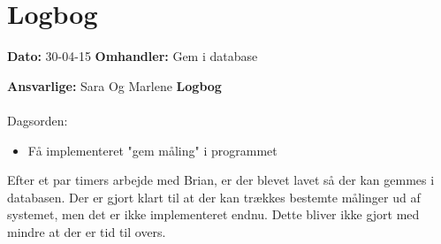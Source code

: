 \chapter{Logbog}

\textbf{Dato:} 30-04-15
\textbf{Omhandler:} Gem i database

\textbf{Ansvarlige:} Sara Og Marlene
\textbf{Logbog}
\\
\\
Dagsorden:
\begin{itemize}
	\item Få implementeret "gem måling" i programmet
\end{itemize}

Efter et par timers arbejde med Brian, er der blevet lavet så der kan gemmes i databasen. Der er gjort klart til at der kan trækkes bestemte målinger ud af systemet, men det er ikke implementeret endnu. Dette bliver ikke gjort med mindre at der er tid til overs. 
